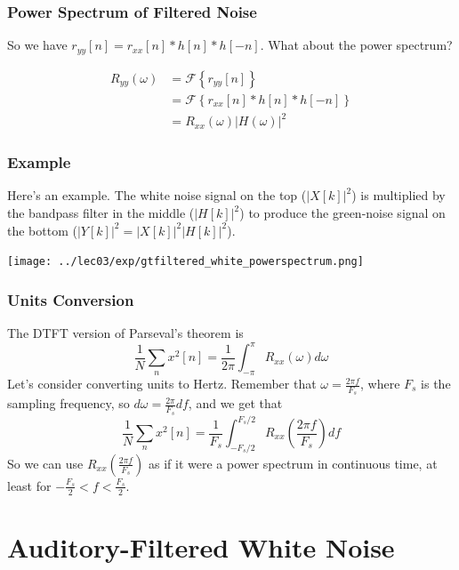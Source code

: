 \documentclass{beamer}
\begin{document}
\begin{frame}
  \frametitle{Power Spectrum of Filtered Noise}

  So we have $r_{yy}[n]=r_{xx}[n]\ast h[n]\ast h[-n]$.  What about the
  power spectrum?

  \begin{align*}
    R_{yy}(\omega) &= {\mathcal F}\left\{r_{yy}[n]\right\} \\
    &= {\mathcal F}\left\{r_{xx}[n]\ast h[n]\ast h[-n]\right\} \\
    &= R_{xx}(\omega)|H(\omega)|^2
  \end{align*}
\end{frame}

\begin{frame}
  \frametitle{Example}

  Here's an example.  The white noise signal on the top ($|X[k]|^2$)
  is multiplied by the bandpass filter in the middle ($|H[k]|^2$) to
  produce the green-noise signal on the bottom
  ($|Y[k]|^2=|X[k]|^2|H[k]|^2$).
  
  \centerline{\texttt{[image: ../lec03/exp/gtfiltered\_white\_powerspectrum.png]}}
\end{frame}

\begin{frame}
  \frametitle{Units Conversion}

  The DTFT version of Parseval's theorem is
  \[
  \frac{1}{N}\sum_{n} x^2[n] = \frac{1}{2\pi}\int_{-\pi}^{\pi} R_{xx}(\omega)d\omega
  \]
  Let's consider converting units to Hertz.  Remember that
  $\omega=\frac{2\pi f}{F_s}$, where $F_s$ is the sampling frequency, so
  $d\omega = \frac{2\pi}{F_s}df$, and we get that
  \[
  \frac{1}{N}\sum_{n} x^2[n] = \frac{1}{F_s}\int_{-F_s/2}^{F_s/2} R_{xx}\left(\frac{2\pi f}{F_s}\right)df
  \]
  So we can use $R_{xx}\left(\frac{2\pi f}{F_s}\right)$ as if it were
  a power spectrum in continuous time, at least for
  $-\frac{F_s}{2}<f<\frac{F_s}{2}$.
\end{frame}
  
\section[White]{Auditory-Filtered White Noise}
\setcounter{subsection}{1}
\end{document}
